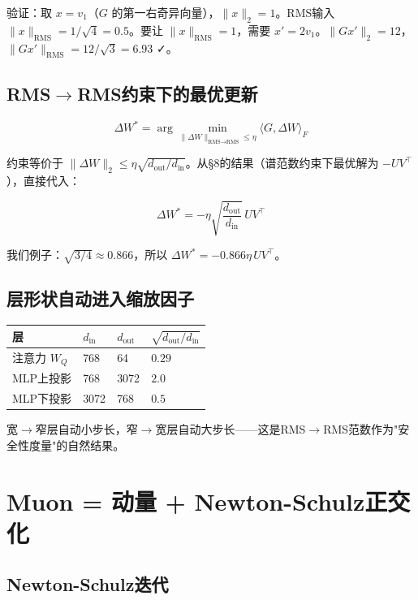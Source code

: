 \documentclass[12pt,a4paper]{article}
\begin{document}
验证：取 $x = v_1$（$G$ 的第一右奇异向量），$\|x\|_2 = 1$。RMS输入 $\|x\|_{\text{RMS}} = 1/\sqrt{4} = 0.5$。要让 $\|x\|_{\text{RMS}} = 1$，需要 $x' = 2v_1$。$\|Gx'\|_2 = 12$，$\|Gx'\|_{\text{RMS}} = 12/\sqrt{3} = 6.93$ ✓。


\subsection{RMS$\to$RMS约束下的最优更新}


\[\Delta W^* = \arg\min_{\|\Delta W\|_{\text{RMS}\to\text{RMS}} \le \eta} \langle G, \Delta W \rangle_F\]

约束等价于 $\|\Delta W\|_2 \le \eta \sqrt{d_{\text{out}}/d_{\text{in}}}$。从§8的结果（谱范数约束下最优解为 $-UV^\top$），直接代入：


\[\boxed{\Delta W^* = -\eta\sqrt{\frac{d_{\text{out}}}{d_{\text{in}}}}\,UV^\top}\]

我们例子：$\sqrt{3/4} \approx 0.866$，所以 $\Delta W^* = -0.866\eta\,UV^\top$。


\subsection{层形状自动进入缩放因子}






\begin{center}\small
\begin{longtable}{|l|l|l|l|}
\hline
层 & $d_{\text{in}}$ & $d_{\text{out}}$ & $\sqrt{d_{\text{out}}/d_{\text{in}}}$ \\
\hline
注意力 $W_Q$ & 768 & 64 & $0.29$ \\
MLP上投影 & 768 & 3072 & $2.0$ \\
MLP下投影 & 3072 & 768 & $0.5$ \\
\hline
\end{longtable}
\end{center}


宽$\to$窄层自动小步长，窄$\to$宽层自动大步长——这是RMS$\to$RMS范数作为"安全性度量"的自然结果。




\section{Muon = 动量 + Newton-Schulz正交化}


\subsection{Newton-Schulz迭代}
\end{document}
